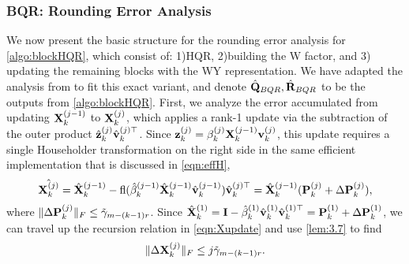 \subsubsection{BQR: Rounding Error Analysis}\label{sec:BQRerr}
We now present the basic structure for the rounding error analysis for \cref{algo:blockHQR}, which consist of: 1)HQR, 2)building the W factor, and 3) updating the remaining blocks with the WY representation.
We have adapted the analysis from \cite{Higham2002} to fit this exact variant, and denote $\hat{\mathbf{Q}}_{BQR},\hat{\mathbf{R}}_{BQR}$ to be the outputs from \cref{algo:blockHQR}.
First, we analyze the error accumulated from updating $\mathbf{X}_k^{(j-1)}$ to $\mathbf{X}_k^{(j)}$, which applies a rank-1 update via the subtraction of the outer product $\hat{\mathbf{z}}_{k}^{(j)}\hat{\mathbf{v}}_{k}^{(j)\top}$.
Since $\mathbf{z}_{k}^{(j)} = \beta_k^{(j)}\mathbf{X}_{k}^{(j-1)}\mathbf{v}_{k}^{(j)}$, this update requires a single Householder transformation on the right side in the same efficient implementation that is discussed in \cref{eqn:effH},
\begin{equation}
\hat{\bb{X}_k^{(j)}} = 
\hat{\bb{X}}_k^{(j-1)} - \fl(\hat{\beta}_k^{(j-1)}\hat{\bb{X}}_k^{(j-1)}\hat{\bb{v}}_k^{(j-1)})\hat{\bb{v}}_k^{(j)\top} = \hat{\bb{X}}_k^{(j-1)}(\bb{P}_k^{(j)}+\Delta \bb{P}_k^{(j)}), \label{eqn:Xupdate}
\end{equation}
where $\|\Delta \mathbf{P}_k^{(j)}\|_F \leq \tilde{\gamma}_{m-(k-1)r}$.
Since $\hat{\mathbf{X}}_k^{(1)} = \mathbf{I} - \hat{\beta}_k^{(1)}\hat{\mathbf{v}}_k^{(1)}\hat{\mathbf{v}}_k^{(1)\top} = \mathbf{P}_k^{(1)} + \Delta \mathbf{P}_k^{(1)}$, we can travel up the recursion relation in \cref{eqn:Xupdate} and use \cref{lem:3.7} to find 
\begin{equation}
	\|\Delta \bb{X}_k^{(j)} \|_F \leq j\tilde{\gamma}_{m-(k-1)r}. \label{eqn:deltX}
\end{equation}

